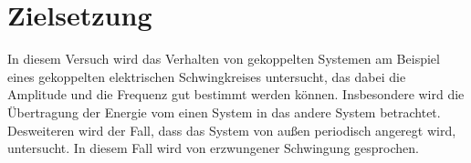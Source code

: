 \section{Zielsetzung}
\label{sec:Zielsetzung}
In diesem Versuch wird das Verhalten von gekoppelten Systemen am Beispiel eines
gekoppelten elektrischen Schwingkreises untersucht, das dabei die Amplitude und
die Frequenz gut bestimmt werden können. Insbesondere wird die Übertragung der
Energie vom einen System in das andere System betrachtet.
Desweiteren wird der Fall, dass das System von außen periodisch angeregt wird,
untersucht. In diesem Fall wird von erzwungener Schwingung gesprochen.

